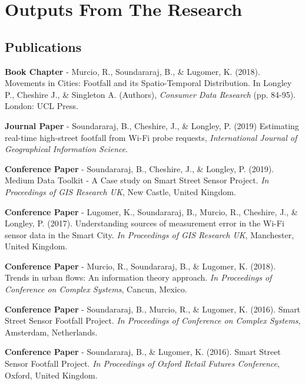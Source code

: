 
\chapter*{Outputs From The Research}

\section*{Publications}
\textbf{Book Chapter} - Murcio, R., Soundararaj, B., \& Lugomer, K. (2018). Movements in Cities: Footfall and its Spatio-Temporal Distribution. In Longley P., Cheshire J., \& Singleton A. (Authors), \textit{Consumer Data Research} (pp. 84-95). London: UCL Press.
\vspace{0.2cm} \par \noindent \textbf{Journal Paper} - Soundararaj, B., Cheshire, J., \& Longley, P. (2019) Estimating real-time high-street footfall from Wi-Fi probe requests, \textit{International Journal of Geographical Information Science}.
\vspace{0.2cm} \par \noindent \textbf{Conference Paper} - Soundararaj, B., Cheshire, J., \& Longley, P. (2019). Medium Data Toolkit - A Case study on Smart Street Sensor Project. \textit{In Proceedings of GIS Research UK}, New Castle, United Kingdom.
\vspace{0.2cm} \par \noindent \textbf{Conference Paper} - Lugomer, K., Soundararaj, B., Murcio, R., Cheshire, J., \& Longley, P. (2017). Understanding sources of measurement error in the Wi-Fi sensor data in the Smart City. \textit{In Proceedings of GIS Research UK}, Manchester, United Kingdom.
\vspace{0.2cm} \par \noindent \textbf{Conference Paper} - Murcio, R., Soundararaj, B., \& Lugomer, K. (2018). Trends in urban flows: An information theory approach. \textit{In Proceedings of Conference on Complex Systems}, Cancun, Mexico.
\vspace{0.2cm} \par \noindent \textbf{Conference Paper} - Soundararaj, B., Murcio, R., \& Lugomer, K. (2016). Smart Street Sensor Footfall Project. \textit{In Proceedings of Conference on Complex Systems}, Amsterdam, Netherlands.
\vspace{0.2cm} \par \noindent \textbf{Conference Paper} - Soundararaj, B., \& Lugomer, K. (2016). Smart Street Sensor Footfall Project. \textit{In Proceedings of Oxford Retail Futures Conference}, Oxford, United Kingdom.

